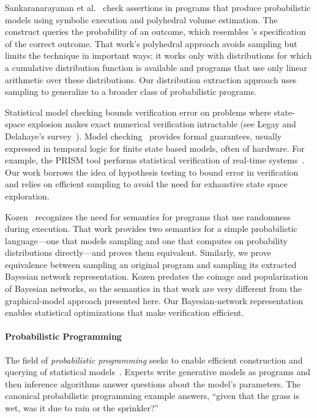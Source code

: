 Sankaranarayanan et al.~\cite{sriram-pldi} check assertions in
programs that produce probabilistic models using symbolic execution
and polyhedral volume estimation. The  construct
queries the probability of an outcome, which resembles \passert's
specification of the correct outcome.
That work's polyhedral approach avoids sampling but limits the technique in
important ways: it works only with
distributions for which a cumulative distribution function is available
and programs that use only linear arithmetic over these distributions.
Our distribution extraction approach uses sampling to generalize to a broader
class of
probabilistic programs.

Statistical model checking bounds verification error on 
problems where state-space explosion makes exact numerical
verification intractable (see Legay and Delahaye's
survey~\cite{legay10}).  Model checking~\cite{Clarke} provides formal guarantees,
usually expressed in temporal logic for finite state
based models, often of hardware. For example, the
PRISM tool performs statistical verification of real-time
systems~\cite{KNP11}. Our work borrows the idea of hypothesis
testing to bound error in verification~\cite{Younes,Younes20061368}
and
relies on efficient sampling to avoid
the need for exhaustive state space exploration.

Kozen~\cite{kozen} recognizes the need for semantics for programs
that use randomness during execution.
That work provides two semantics for a simple probabilistic
language---one that models sampling and one that computes on probability
distributions directly---and proves them equivalent.
Similarly, we prove equivalence between sampling an original program and
sampling its extracted Bayesian network representation.
Kozen predates the coinage and popularization of Bayesian networks, so
the semantics in that work are very different from the graphical-model approach
presented here.
Our Bayesian-network representation enables statistical optimizations that
make \passert verification efficient.

\paragraph{Probabilistic Programming}
The field of \emph{probabilistic programming} seeks to enable efficient
construction and querying of statistical models~\cite{BBGR13, wingate-lightweight,
  church, chaganty, pfeffersample, probdsl, koller}.  Experts write
generative models as programs and then inference algorithms answer questions
about the model's parameters. The canonical probabilistic programming example
answers, ``given that the grass is wet, was it due to rain or the sprinkler?''

